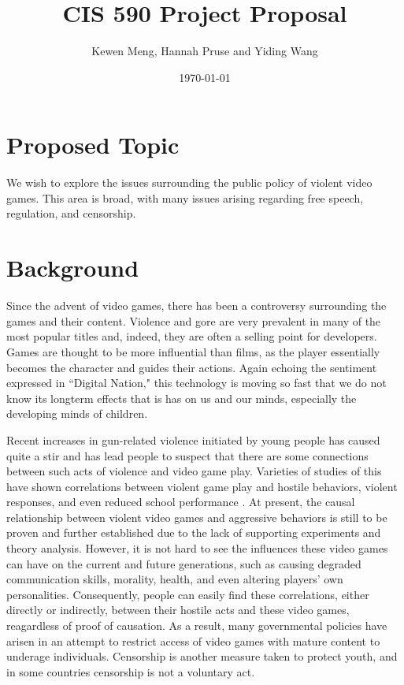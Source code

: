 \documentclass[12pt]{article}
\title{CIS 590 Project Proposal}
\author{Kewen Meng, Hannah Pruse and Yiding Wang}
\date{\today}
\begin{document}
\maketitle
\vspace{-10mm}
\section*{Proposed Topic}
We wish to explore the issues surrounding the public policy of violent video games. This area is broad, with many issues arising regarding free speech, regulation, and censorship. 

\section*{Background}
\indent\indent Since the advent of video games, there has been a controversy surrounding the games and their content. Violence and gore are very prevalent in many of the most popular titles and, indeed, they are often a selling point for developers. Games are thought to be more influential than films, as the player essentially becomes the character and guides their actions. Again echoing the sentiment expressed in ``Digital Nation," this technology is moving so fast that we do not know its longterm effects that is has on us and our minds, especially the developing minds of children.

Recent increases in gun-related violence initiated by young people has caused quite a stir and has lead people to suspect that there are some connections between such acts of violence and video game play. Varieties of studies of this have shown correlations between violent game play and hostile behaviors, violent responses, and even reduced school performance \cite{barlett2009, gentile2004, anderson2003}. At present, the causal relationship between violent video games and aggressive behaviors is still to be proven and further established due to the lack of supporting experiments and theory analysis. However, it is not hard to see the influences these video games can have on the current and future generations, such as causing degraded communication skills, morality, health, and even altering players' own personalities. Consequently, people can easily find these correlations, either directly or indirectly, between their hostile acts and these video games, reagardless of proof of causation. As a result, many governmental policies have arisen in an attempt to restrict access of video games with mature content to underage individuals. Censorship is another measure taken to protect youth, and in some countries censorship is not a voluntary act.
\end{document}
